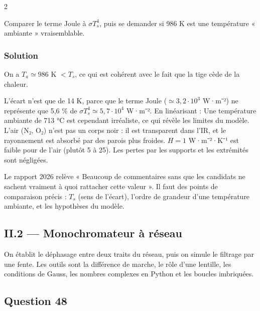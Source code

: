 \documentclass[11pt,a4paper]{article}
\newcommand{\equationajustee}[1]{%
  \sbox{\boiteequation}{$\displaystyle #1$}%
  \ifdim\wd\boiteequation>\linewidth
    \[\resizebox{\linewidth}{!}{\usebox{\boiteequation}}\]%
  \else
    \[#1\]%
  \fi}
\begin{document}
\begin{indication}{2}

Comparer le terme Joule à \(\sigma T_s^4\), puis se demander si 986 K est une température « ambiante » vraisemblable.

\end{indication}

\hypertarget{solution-46}{%
\subsubsection{Solution}\label{solution-46}}

On a \(T_a\simeq986\) K \(<T_s\), ce qui est cohérent avec le fait que la tige cède de la chaleur.

L'écart n'est que de 14 K, parce que le terme Joule (\(\simeq3{,}2\cdot10^3\) W·m⁻²) ne représente que 5,6 \% de \(\sigma T_s^4\simeq5{,}7\cdot10^4\) W·m⁻². En linéarisant :
\equationajustee{\Delta T\simeq\frac{3{,}2\cdot10^3}{4\sigma T_s^3+H}\simeq14\ \mathrm K .}
Une température ambiante de 713 °C est cependant irréaliste, ce qui révèle les limites du modèle. L'air (N₂, O₂) n'est pas un corps noir : il est transparent dans l'IR, et le rayonnement est absorbé par des parois plus froides. \(H=1\) W·m⁻²·K⁻¹ est faible pour de l'air (plutôt 5 à 25). Les pertes par les supports et les extrémités sont négligées.

\begin{jury}

Le rapport 2026 relève « Beaucoup de commentaires sans que les candidats ne sachent vraiment à quoi rattacher cette valeur ». Il faut des points de comparaison précis : \(T_s\) (sens de l'écart), l'ordre de grandeur d'une température ambiante, et les hypothèses du modèle.

\end{jury}

\hypertarget{ii.2-monochromateur-uxe0-ruxe9seau}{%
\subsection{II.2 --- Monochromateur à réseau}\label{ii.2-monochromateur-uxe0-ruxe9seau}}

On établit le déphasage entre deux traits du réseau, puis on simule le filtrage par une fente. Les outils sont la différence de marche, le rôle d'une lentille, les conditions de Gauss, les nombres complexes en Python et les boucles imbriquées.

\hypertarget{question-48}{%
\subsection{Question 48}\label{question-48}}
\end{document}
